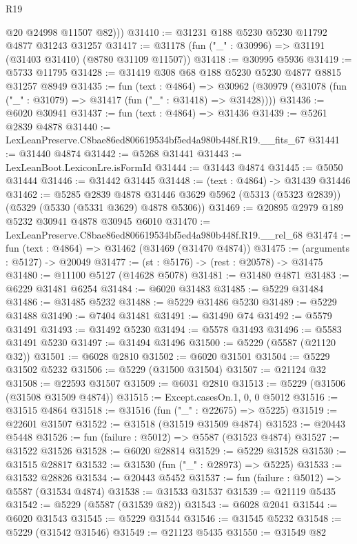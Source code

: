 \begin{lexlean}{R19}
\begin{coremodule}
          @20
          @24998
          @11507
          @82)))
@31410 := @31231 @188 @5230 @5230 @11792 @4877 @31243 @31257
@31417 := @31178 (fun ("_" : @30996) => @31191 (@31403 @31410) (@8780 @31109 @11507))
@31418 := @30995 @5936
@31419 := @5733 @11795
@31428 := @31419 @308 @68 @188 @5230 @5230 @4877 @8815 @31257 @8949
@31435 := fun (text : @4864) =>
  @30962 (@30979 (@31078 (fun ("_" : @31079) => @31417 (fun ("_" : @31418) => @31428))))
@31436 := @6020 @30941
@31437 := fun (text : @4864) => @31436
@31439 := @5261 @2839 @4878
@31440 := LexLeanPreserve.C8bae86ed806619534bf5ed4a980b448f.R19.__fits_67
@31441 := @31440 @4874
@31442 := @5268 @31441
@31443 := LexLeanBoot.LexiconLre.isFormId
@31444 := @31443 @4874
@31445 := @5050 @31444
@31446 := @31442 @31445
@31448 := (text : @4864) -> @31439 @31446
@31462 := @5285
    @2839
    @4878
    @31446
    @3629
    @5962
    (@5313 (@5323 @2839))
    (@5329 (@5330 (@5331 @3629) @4878 @5306))
@31469 := @20895 @2979 @189 @5232 @30941 @4878 @30945 @6010
@31470 := LexLeanPreserve.C8bae86ed806619534bf5ed4a980b448f.R19.__rel_68
@31474 := fun (text : @4864) => @31462 (@31469 (@31470 @4874))
@31475 := (arguments : @5127) -> @20049
@31477 := (st : @5176) -> (rest : @20578) -> @31475
@31480 := @11100 @5127 (@14628 @5078)
@31481 := @31480 @4871
@31483 := @6229 @31481 @6254
@31484 := @6020 @31483
@31485 := @5229 @31484
@31486 := @31485 @5232
@31488 := @5229 @31486 @5230
@31489 := @5229 @31488
@31490 := @7404 @31481
@31491 := @31490 @74
@31492 := @5579 @31491
@31493 := @31492 @5230
@31494 := @5578 @31493
@31496 := @5583 @31491 @5230
@31497 := @31494 @31496
@31500 := @5229 (@5587 (@21120 @32))
@31501 := @6028 @2810
@31502 := @6020 @31501
@31504 := @5229 @31502 @5232
@31506 := @5229 (@31500 @31504)
@31507 := @21124 @32
@31508 := @22593 @31507
@31509 := @6031 @2810
@31513 := @5229 (@31506 (@31508 @31509 @4874))
@31515 := Except.casesOn.{1, 0, 0} @5012
@31516 := @31515 @4864
@31518 := @31516 (fun ("_" : @22675) => @5225)
@31519 := @22601 @31507
@31522 := @31518 (@31519 @31509 @4874)
@31523 := @20443 @5448
@31526 := fun (failure : @5012) => @5587 (@31523 @4874)
@31527 := @31522 @31526
@31528 := @6020 @28814
@31529 := @5229 @31528
@31530 := @31515 @28817
@31532 := @31530 (fun ("_" : @28973) => @5225)
@31533 := @31532 @28826
@31534 := @20443 @5452
@31537 := fun (failure : @5012) => @5587 (@31534 @4874)
@31538 := @31533 @31537
@31539 := @21119 @5435
@31542 := @5229 (@5587 (@31539 @82))
@31543 := @6028 @2041
@31544 := @6020 @31543
@31545 := @5229 @31544
@31546 := @31545 @5232
@31548 := @5229 (@31542 @31546)
@31549 := @21123 @5435
@31550 := @31549 @82

\end{coremodule}
\end{lexlean}
